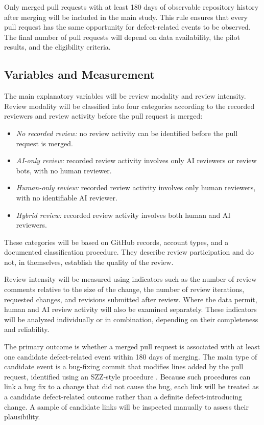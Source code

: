 \documentclass[stu,12pt,donotrepeattitle]{apa7}
\begin{document}
Only merged pull requests with at least 180 days of observable repository history after merging will be included in the main study. This rule ensures that every pull request has the same opportunity for defect-related events to be observed. The final number of pull requests will depend on data availability, the pilot results, and the eligibility criteria.

\subsection{Variables and Measurement}

The main explanatory variables will be review modality and review intensity. Review modality will be classified into four categories according to the recorded reviewers and review activity before the pull request is merged:

\begin{itemize}
  \item \textit{No recorded review:} no review activity can be identified before the pull request is merged.
  \item \textit{AI-only review:} recorded review activity involves only AI reviewers or review bots, with no human reviewer.
  \item \textit{Human-only review:} recorded review activity involves only human reviewers, with no identifiable AI reviewer.
  \item \textit{Hybrid review:} recorded review activity involves both human and AI reviewers.
\end{itemize}

These categories will be based on GitHub records, account types, and a documented classification procedure. They describe review participation and do not, in themselves, establish the quality of the review.

Review intensity will be measured using indicators such as the number of review comments relative to the size of the change, the number of review iterations, requested changes, and revisions submitted after review. Where the data permit, human and AI review activity will also be examined separately. These indicators will be analyzed individually or in combination, depending on their completeness and reliability.

The primary outcome is whether a merged pull request is associated with at least one candidate defect-related event within 180 days of merging. The main type of candidate event is a bug-fixing commit that modifies lines added by the pull request, identified using an SZZ-style procedure \parencite{sliwerski2005}. Because such procedures can link a bug fix to a change that did not cause the bug, each link will be treated as a candidate defect-related outcome rather than a definite defect-introducing change. A sample of candidate links will be inspected manually to assess their plausibility.
\end{document}
